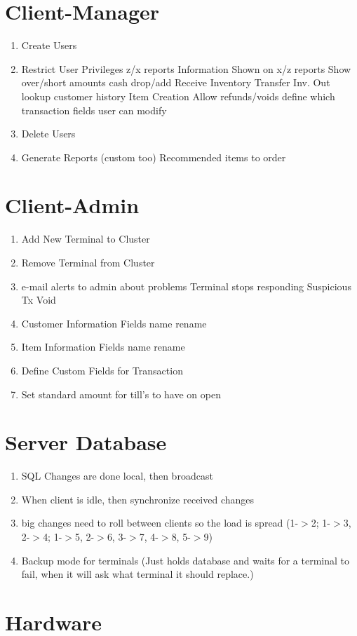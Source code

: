 \section{Client-Manager}
\begin{enumerate}
	\item Create Users
	\item Restrict User Privileges
		\subitem z/x reports
			\subsubitem Information Shown on x/z reports
			\subsubitem Show over/short amounts
		\subitem cash drop/add
		\subitem Receive Inventory
		\subitem Transfer Inv. Out
		\subitem lookup customer history
		\subitem Item Creation
		\subitem Allow refunds/voids
		\subitem define which transaction fields user can modify
	\item Delete Users
	\item Generate Reports (custom too)
		\subitem Recommended items to order
\end{enumerate}

\section{Client-Admin}
\begin{enumerate}
	\item Add New Terminal to Cluster
	\item Remove Terminal from Cluster
	\item e-mail alerts to admin about problems
		\subitem Terminal stops responding
		\subitem Suspicious Tx Void
	\item Customer Information Fields name rename
	\item Item Information Fields name rename
	\item Define Custom Fields for Transaction
	\item Set standard amount for till's to have on open
\end{enumerate}

\section{Server Database}
\begin{enumerate}
	\item SQL Changes are done local, then broadcast
	\item When client is idle, then synchronize received changes
	\item big changes need to roll between clients so the load is spread (1-$>$2; 1-$>$3, 2-$>$4; 1-$>$5, 2-$>$6, 3-$>$7, 4-$>$8, 5-$>$9)
	\item Backup mode for terminals (Just holds database and waits for a terminal to fail, when it will ask what terminal it should replace.)
\end{enumerate}

\section{Hardware}
